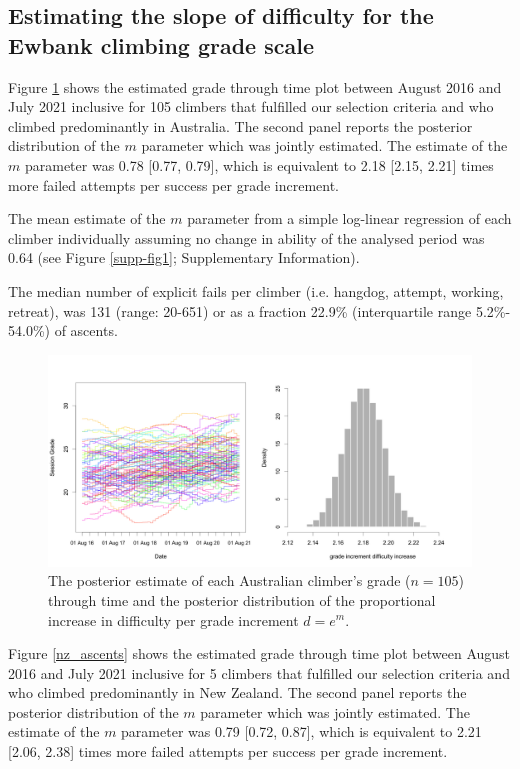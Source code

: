 \documentclass{article}
\newcommand{\C}{105}
\newcommand{\meanm}{0.78}
\newcommand{\lowm}{0.77}
\newcommand{\highm}{0.79}
\newcommand{\meand}{2.18}
\newcommand{\lowd}{2.15}
\newcommand{\highd}{2.21}
\newcommand{\meanregm}{0.64}
\newcommand{\Cnz}{5}
\newcommand{\meanmnz}{0.79}
\newcommand{\lowmnz}{0.72}
\newcommand{\highmnz}{0.87}
\newcommand{\meandnz}{2.21}
\newcommand{\lowdnz}{2.06}
\newcommand{\highdnz}{2.38}
\begin{document}
\subsection*{Estimating the slope of difficulty for the Ewbank climbing grade scale}


Figure \ref{aus_ascents} shows the estimated grade through time plot between August 2016 and July 2021 inclusive for \C{} climbers that fulfilled our selection criteria and who climbed predominantly in Australia. The second panel reports the posterior distribution of the $m$ parameter which was jointly estimated.
The estimate of the $m$ parameter was \meanm{} [\lowm, \highm], which is equivalent to \meand{} [\lowd, \highd] times more failed attempts per success per grade increment. 

The mean estimate of the $m$ parameter from a simple log-linear regression of each climber individually assuming no change in ability of the analysed period was \meanregm{} (see Figure \ref{supp-fig1}; Supplementary Information). 

The median number of explicit fails per climber (i.e. \gls{hangdog}, attempt, working, retreat), was 131 (range: 20-651) or as a fraction 22.9\% (interquartile range 5.2\%- 54.0\%) of ascents.
\begin{figure}
\centering
\includegraphics[width=\textwidth]{../results/aus/ascents-from-2016-08-01-to-2021-08-01-minAscents400-minFails1-session-posterior.png}
\caption{\small The posterior estimate of each Australian climber's grade ($n=\C$) through time and the posterior distribution of the proportional increase in difficulty per grade increment $d = e^m$.}
\label{aus_ascents}
\end{figure}

Figure \ref{nz_ascents} shows the estimated grade through time plot between August 2016 and July 2021 inclusive for \Cnz{} climbers that fulfilled our selection criteria and who climbed predominantly in New Zealand. The second panel reports the posterior distribution of the $m$ parameter which was jointly estimated.
The estimate of the $m$ parameter was \meanmnz{} [\lowmnz, \highmnz], which is equivalent to \meandnz{} [\lowdnz, \highdnz] times more failed attempts per success per grade increment. 
\end{document}

